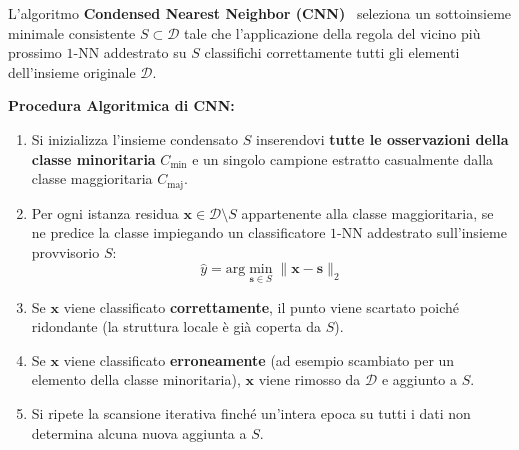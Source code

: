 \begin{definition}
L'algoritmo \textbf{Condensed Nearest Neighbor (CNN)}~\cite{hart1968} seleziona un sottoinsieme minimale consistente $S \subset \mathcal{D}$ tale che l'applicazione della regola del vicino più prossimo $1$-NN addestrato su $S$ classifichi correttamente tutti gli elementi dell'insieme originale $\mathcal{D}$.
\end{definition}

\textbf{Procedura Algoritmica di CNN:}
\begin{enumerate}
    \item Si inizializza l'insieme condensato $S$ inserendovi \textbf{tutte le osservazioni della classe minoritaria} $C_{\text{min}}$ e un singolo campione estratto casualmente dalla classe maggioritaria $C_{\text{maj}}$.
    \item Per ogni istanza residua $\mathbf{x} \in \mathcal{D} \setminus S$ appartenente alla classe maggioritaria, se ne predice la classe impiegando un classificatore $1$-NN addestrato sull'insieme provvisorio $S$:
    \begin{equation}
        \hat{y} = \text{arg}\min_{\mathbf{s} \in S} \|\mathbf{x} - \mathbf{s}\|_2
    \end{equation}
    \item Se $\mathbf{x}$ viene classificato \textbf{correttamente}, il punto viene scartato poiché ridondante (la struttura locale è già coperta da $S$).
    \item Se $\mathbf{x}$ viene classificato \textbf{erroneamente} (ad esempio scambiato per un elemento della classe minoritaria), $\mathbf{x}$ viene rimosso da $\mathcal{D}$ e aggiunto a $S$.
    \item Si ripete la scansione iterativa finché un'intera epoca su tutti i dati non determina alcuna nuova aggiunta a $S$.
\end{enumerate}

